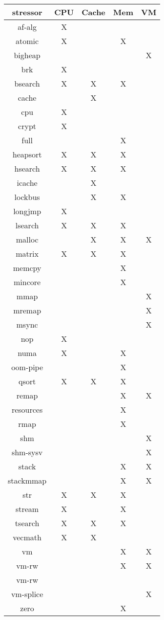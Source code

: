\begin{tabular}{ccccc}
\toprule
stressor & CPU & Cache & Mem & VM \\
\midrule
af-alg    & X   &   &     & \\
atomic    & X   &   & X   & \\
bigheap   &     &   &     & X \\
brk       & X   &   &     & \\
bsearch   & X   & X & X   & \\
cache     &     & X &     &  \\
cpu       & X   &   &     & \\
crypt     &  X  &   &     &  \\
full      &     &   &  X   &  \\
heapsort  &  X  & X & X    &  \\
hsearch   &  X  & X &  X   &  \\
icache    &     & X &      &  \\
lockbus   &     & X &  X   &  \\
longjmp   &  X  &   &     &  \\
lsearch   &  X  & X &  X   &  \\
malloc    &     & X &  X   & X \\
matrix    &  X  & X &  X   &  \\
memcpy    &     &   &  X   &  \\
mincore   &     &   &  X   &  \\
mmap      &     &   &     & X \\
mremap    &     &   &     & X \\
msync     &     &   &     & X \\
nop       &   X &   &     &  \\
numa      &  X  &   &  X   &  \\
oom-pipe  &     &   &  X   &  \\
qsort     &  X  & X &  X   &  \\
remap     &     &   &  X   & X \\
resources &     &   &  X   &  \\
rmap      &     &   &   X  &  \\
shm       &     &   &     & X \\
shm-sysv  &     &   &     & X \\
stack     &     &   &  X   & X \\
stackmmap &     &   &  X   & X \\
str       &  X  & X &  X   &  \\
stream    &  X  &   & X    &  \\
tsearch   & X   & X & X    &  \\
vecmath   &  X  & X &     &  \\
vm        &     &   &  X   & X \\
vm-rw     &     &   &  X   & X \\
vm-rw     &     &   &     &  \\
vm-splice &     &   &     & X \\
zero      &     &   & X    &  \\
\bottomrule
\end{tabular}
